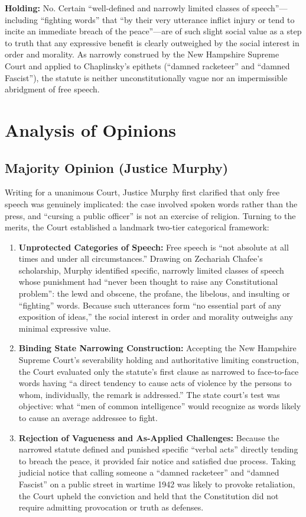\documentclass[12pt]{article}
\begin{document}
\textbf{Holding:} No. Certain ``well-defined and narrowly limited classes of speech''---including ``fighting words'' that ``by their very utterance inflict injury or tend to incite an immediate breach of the peace''---are of such slight social value as a step to truth that any expressive benefit is clearly outweighed by the social interest in order and morality. As narrowly construed by the New Hampshire Supreme Court and applied to Chaplinsky's epithets (``damned racketeer'' and ``damned Fascist''), the statute is neither unconstitutionally vague nor an impermissible abridgment of free speech.

\section{Analysis of Opinions}
\subsection{Majority Opinion (Justice Murphy)}

Writing for a unanimous Court, Justice Murphy first clarified that only free speech was genuinely implicated: the case involved spoken words rather than the press, and ``cursing a public officer'' is not an exercise of religion. Turning to the merits, the Court established a landmark two-tier categorical framework:
\begin{enumerate}
  \item \textbf{Unprotected Categories of Speech:} Free speech is ``not absolute at all times and under all circumstances.'' Drawing on Zechariah Chafee's scholarship, Murphy identified specific, narrowly limited classes of speech whose punishment had ``never been thought to raise any Constitutional problem'': the lewd and obscene, the profane, the libelous, and insulting or ``fighting'' words. Because such utterances form ``no essential part of any exposition of ideas,'' the social interest in order and morality outweighs any minimal expressive value.
  \item \textbf{Binding State Narrowing Construction:} Accepting the New Hampshire Supreme Court's severability holding and authoritative limiting construction, the Court evaluated only the statute's first clause as narrowed to face-to-face words having ``a direct tendency to cause acts of violence by the persons to whom, individually, the remark is addressed.'' The state court's test was objective: what ``men of common intelligence'' would recognize as words likely to cause an average addressee to fight.
  \item \textbf{Rejection of Vagueness and As-Applied Challenges:} Because the narrowed statute defined and punished specific ``verbal acts'' directly tending to breach the peace, it provided fair notice and satisfied due process. Taking judicial notice that calling someone a ``damned racketeer'' and ``damned Fascist'' on a public street in wartime 1942 was likely to provoke retaliation, the Court upheld the conviction and held that the Constitution did not require admitting provocation or truth as defenses.
\end{enumerate}
\end{document}
